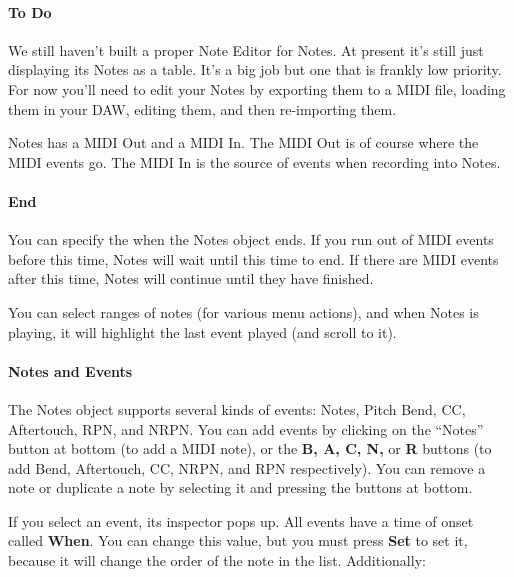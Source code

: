 \documentclass[twoside,10pt]{article}
\begin{document}
\paragraph{\color{red} To Do} We still haven't built a proper Note Editor for Notes.  At present it's still just displaying its Notes as a table.  It's a big job but one that is frankly low priority.  For now you'll need to edit your Notes by exporting them to a MIDI file, loading them in your DAW, editing them, and then re-importing them.

Notes has a MIDI Out and a MIDI In.  The MIDI Out is of course where the MIDI events go.  The MIDI In is the source of events when recording into Notes.

\paragraph{End} You can specify the when the Notes object ends.   If you run out of MIDI events before this time, Notes will wait until this time to end.  If there are MIDI events after this time, Notes will continue until they have finished.

You can select ranges of notes (for various menu actions), and when Notes is playing, it will highlight the last event played (and scroll to it).

\paragraph{Notes and Events} The Notes object supports several kinds of events: Notes, Pitch Bend, CC, Aftertouch, RPN, and NRPN.  You can add events by clicking on the ``Notes'' button at bottom (to add a MIDI note), or the {\bf B, A, C, N,} or {\bf R} buttons (to add Bend, Aftertouch, CC, NRPN, and RPN respectively).  You can remove a note or duplicate a note by selecting it and pressing the buttons at bottom. 

If you select an event, its inspector pops up.  All events have a time of onset called {\bf When}.  You can change this value, but you must press {\bf Set} to set it, because it will change the order of the note in the list.  Additionally:
\end{document}
